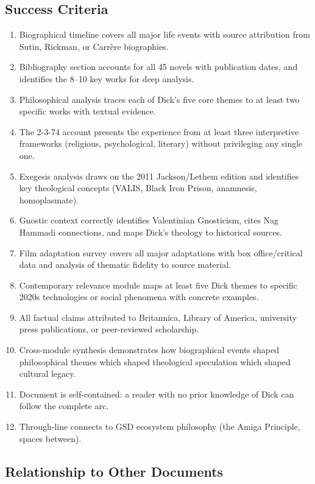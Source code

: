 \documentclass[11pt,letterpaper]{article}
\begin{document}
\subsection{Success Criteria}

\begin{enumerate}[leftmargin=2em]
\item Biographical timeline covers all major life events with source attribution from Sutin, Rickman, or Carrère biographies.
\item Bibliography section accounts for all 45 novels with publication dates, and identifies the 8--10 key works for deep analysis.
\item Philosophical analysis traces each of Dick's five core themes to at least two specific works with textual evidence.
\item The 2-3-74 account presents the experience from at least three interpretive frameworks (religious, psychological, literary) without privileging any single one.
\item Exegesis analysis draws on the 2011 Jackson/Lethem edition and identifies key theological concepts (VALIS, Black Iron Prison, anamnesis, homoplasmate).
\item Gnostic context correctly identifies Valentinian Gnosticism, cites Nag Hammadi connections, and maps Dick's theology to historical sources.
\item Film adaptation survey covers all major adaptations with box office/critical data and analysis of thematic fidelity to source material.
\item Contemporary relevance module maps at least five Dick themes to specific 2020s technologies or social phenomena with concrete examples.
\item All factual claims attributed to Britannica, Library of America, university press publications, or peer-reviewed scholarship.
\item Cross-module synthesis demonstrates how biographical events shaped philosophical themes which shaped theological speculation which shaped cultural legacy.
\item Document is self-contained: a reader with no prior knowledge of Dick can follow the complete arc.
\item Through-line connects to GSD ecosystem philosophy (the Amiga Principle, spaces between).
\end{enumerate}

\subsection{Relationship to Other Documents}
\end{document}
